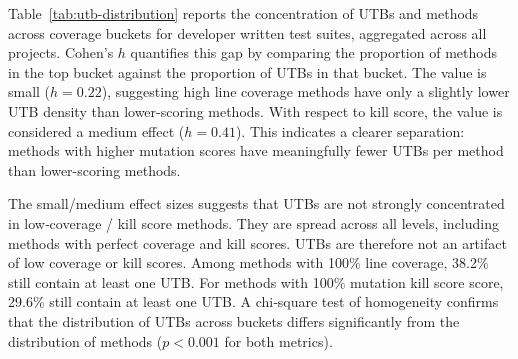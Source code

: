 Table~\ref{tab:utb-distribution} reports the concentration of UTBs and methods across coverage buckets for developer written test suites, aggregated across all projects. 
Cohen's $h$ quantifies this gap by comparing the proportion of methods in the top bucket against the proportion of UTBs in that bucket. The value is small ($h=0.22$), suggesting high line coverage methods have only a slightly lower UTB density than lower-scoring methods.
With respect to kill score, the value is considered a medium effect ($h=0.41$).
This indicates a clearer separation: methods with higher mutation scores have meaningfully fewer UTBs per method than lower-scoring methods. 

The small/medium effect sizes suggests that UTBs are not strongly concentrated in low‑coverage / kill score methods. They are spread across all levels, including methods with perfect coverage and kill scores. 
UTBs are therefore not an artifact of low coverage or kill scores. 
Among methods with 100\% line coverage, 38.2\% still contain at least one UTB.
For methods with 100\% mutation kill score score, 29.6\% still contain at least one UTB.
%
A chi‑square test of homogeneity confirms that the distribution of UTBs across buckets differs significantly from the distribution of methods ($p < 0.001$ for both metrics). 

